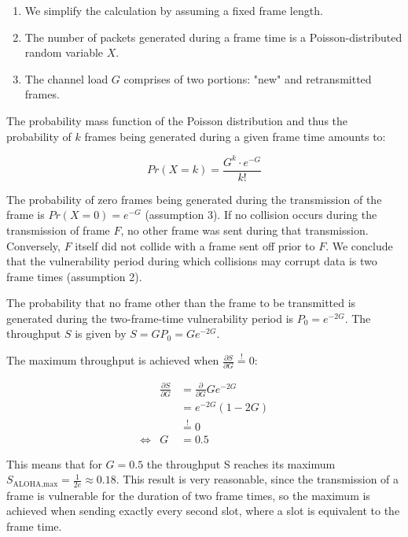 \smallskip

\begin{enumerate}
	\item We simplify the calculation by assuming a fixed frame length.
	\item The number of packets generated during a frame time is a Poisson-distributed random variable $X$.
	\item The channel load $G$ comprises of two portions: "new" and retransmitted frames.
\end{enumerate}

The probability mass function of the Poisson distribution and thus the probability of $k$ frames being generated during a given frame time amounts to:

\begin{equation}
	Pr(X=k) = \frac{G^k\cdot e^{-G}}{k!}
\end{equation}

\noindent The probability of zero frames being generated during the transmission of the frame is $Pr(X=0) = e^{-G}$ (assumption 3). If no collision occurs during the transmission of frame $F$, no other frame was sent during that transmission. Conversely, $F$ itself did not collide with a frame sent off prior to $F$. We conclude that the vulnerability period during which collisions may corrupt data is two frame times (assumption 2).

The probability that no frame other than the frame to be transmitted is generated during the two-frame-time vulnerability period is $P_0 = e^{-2G}$. The throughput $S$ is given by $S=GP_0 = Ge^{-2G}$.

The maximum throughput is achieved when $\frac{\partial S}{\partial G} \stackrel{!}{=} 0$:

\begin{eqnarray}
	& \frac{\partial S}{\partial G} & = \frac{\partial}{\partial G} Ge^{-2G} \\ 
	& & = e^{-2G}(1-2G) \\
	& & \stackrel{!}{=} 0 \\
	\Leftrightarrow & G & = 0.5
\end{eqnarray}
	
This means that for $G=0.5$ the throughput S reaches its maximum $S_\text{ALOHA,max} = \frac{1}{2e} \approx 0.18$. This result is very reasonable, since the transmission of a frame is vulnerable for the duration of two frame times, so the maximum is achieved when sending exactly every second slot, where a slot is equivalent to the frame time.

